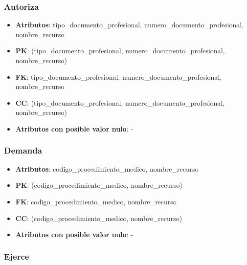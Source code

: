 \documentclass[a4paper,11pt]{article}
\begin{document}
\subsubsection{\textbf{Autoriza}}

\begin{itemize}

\item 
\textbf{Atributos}: tipo\_documento\_profesional, numero\_documento\_profesional, nombre\_recurso

\item 
\textbf{PK}: (tipo\_documento\_profesional, numero\_documento\_profesional, nombre\_recurso)

\item
\textbf{FK}: tipo\_documento\_profesional, numero\_documento\_profesional, nombre\_recurso

\item 
\textbf{CC}: (tipo\_documento\_profesional, numero\_documento\_profesional, nombre\_recurso)

\item 
\textbf{Atributos con posible valor nulo}: -

\end{itemize}
\subsubsection{\textbf{Demanda}}

\begin{itemize}

\item 
\textbf{Atributos}: codigo\_procedimiento\_medico, nombre\_recurso

\item 
\textbf{PK}: (codigo\_procedimiento\_medico, nombre\_recurso)

\item
\textbf{FK}: codigo\_procedimiento\_medico, nombre\_recurso 

\item 
\textbf{CC}: (codigo\_procedimiento\_medico, nombre\_recurso)

\item 
\textbf{Atributos con posible valor nulo}: -

\end{itemize}


\subsubsection{\textbf{Ejerce}}
\end{document}
